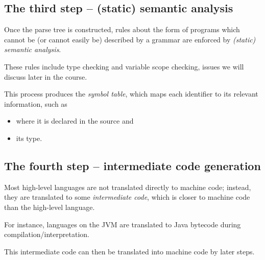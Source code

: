 \documentclass[11pt]{article}
\theoremstyle{definition}
\begin{document}
\subsection{The third step – (static) semantic analysis}
\label{sec:orgd94f1ec}
Once the parse tree is constructed,
rules about the form of programs
which cannot be (or cannot easily be)
described by a grammar are enforced
by \emph{(static) semantic analysis}.

These rules include type checking and variable scope checking,
issues we will discuss later in the course.

This process produces the \emph{symbol table}, which maps
each identifier to its relevant information,
such as
\begin{itemize}
\item where it is declared in the source and
\item its type.
\end{itemize}

\subsection{The fourth step – intermediate code generation}
\label{sec:orge1d5e37}
Most high-level languages are not translated directly to machine code;
instead, they are translated to some \emph{intermediate code},
which is closer to machine code than the high-level language.

For instance, languages on the JVM are translated
to Java bytecode during compilation/interpretation.

This intermediate code can then be translated
into machine code by later steps.
\end{document}
